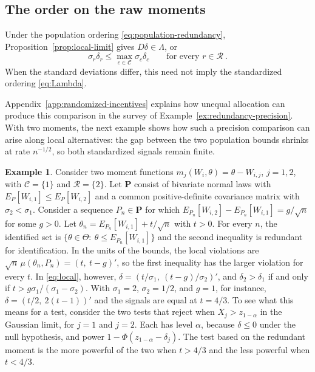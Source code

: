 \documentclass[11pt]{article}
\newcommand{\red}[1]{{\color{red}#1}} %
\numberwithin{equation}{section}
\theoremstyle{definition}
\newtheorem{example}{Example}
\begin{document}
\subsection{The order on the raw moments}\label{app:raw-order}

Under the population ordering \eqref{eq:population-redundancy}, Proposition~\ref{prop:local-limit} gives $D\delta\in\Lambda$, or
\begin{equation}\label{eq:Lambda-D}
\sigma_r\delta_r\le\max_{c\in\mathcal C}\sigma_c\delta_c
\qquad\text{for every }r\in\mathcal R~.
\end{equation}
When the standard deviations differ, this need not imply the standardized ordering \eqref{eq:Lambda}.

Appendix~\ref{app:randomized-incentives} explains how unequal allocation can produce this comparison in the survey of Example~\ref{ex:redundancy-precision}. With two moments, the next example shows how such a precision comparison can arise along local alternatives: the gap between the two population bounds shrinks at rate $n^{-1/2}$, so both standardized signals remain finite.

\begin{example}\label{ex:ranking}
Consider two moment functions $m_j(W_i,\theta)=\theta-W_{i,j}$, $j=1,2$, with $\mathcal C=\{1\}$ and $\mathcal R=\{2\}$. \red{Let $\mathbf P$ consist of bivariate normal laws with $E_P[W_{i,1}]\le E_P[W_{i,2}]$ and a common positive-definite covariance matrix with $\sigma_2<\sigma_1$. Consider a sequence $P_n\in\mathbf P$ for which $E_{P_n}[W_{i,2}]-E_{P_n}[W_{i,1}]=g/\sqrt n$ for some $g>0$.} Let $\theta_n=E_{P_n}[W_{i,1}]+t/\sqrt n$ with $t>0$. For every $n$, the identified set is $\{\theta\in\Theta:\ \theta\le E_{P_n}[W_{i,1}]\}$ and the second inequality is redundant for identification. In the units of the bounds, the local violations are $\sqrt n\,\mu(\theta_n,P_n)=(t,\ t-g)'$, so the first inequality has the larger violation for every $t$. In \eqref{eq:local}, however, $\delta=(t/\sigma_1,\ (t-g)/\sigma_2)'$, and $\delta_2>\delta_1$ if and only if $t>g\sigma_1/(\sigma_1-\sigma_2)$. With $\sigma_1=2$, $\sigma_2=1/2$, and $g=1$, for instance, $\delta=(t/2,\ 2(t-1))'$ \red{and the signals are equal at $t=4/3$.} To see what this means for a test, consider the two tests that reject when $X_j>z_{1-\alpha}$ in the Gaussian limit, for $j=1$ and $j=2$. Each has level $\alpha$, because $\delta\le0$ under the null hypothesis, and power $1-\Phi(z_{1-\alpha}-\delta_j)$. The test based on the redundant moment is the more powerful of the two when $t>4/3$ and the less powerful when $t<4/3$.
\end{example}
\end{document}
